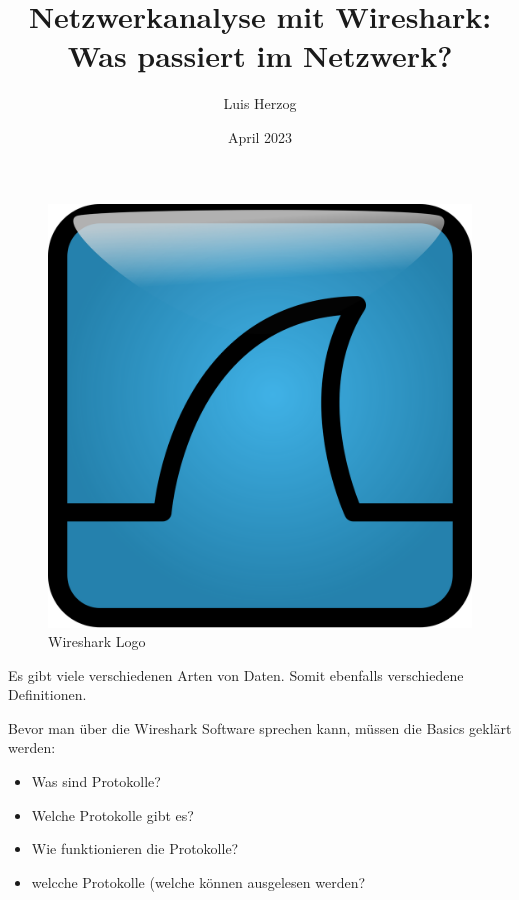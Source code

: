 \documentclass[12pt]{article}
\title{Netzwerkanalyse mit Wireshark: Was passiert im Netzwerk?}
\author{Luis Herzog}
\date{April 2023}
\begin{document}

\maketitle

\begin{figure}[h]
	\centering
	\includegraphics[scale=0.1]{Bilder/Wireshark_icon.svg.png}
	\caption{Wireshark Logo \cite{wireshark-logo}}
	\label{fig:figure1}
\end{figure}

\thispagestyle{empty}
\newpage
\tableofcontents
\thispagestyle{empty}
\newpage

Es gibt viele verschiedenen Arten von Daten. Somit ebenfalls verschiedene Definitionen. 

Bevor man über die Wireshark Software sprechen kann, müssen die Basics geklärt werden:

\begin{itemize}
	\item Was sind Protokolle?
	\item Welche Protokolle gibt es?
	\item Wie funktionieren die Protokolle?
	\item welcche Protokolle (welche können ausgelesen werden?
\end{itemize}
\end{document}
